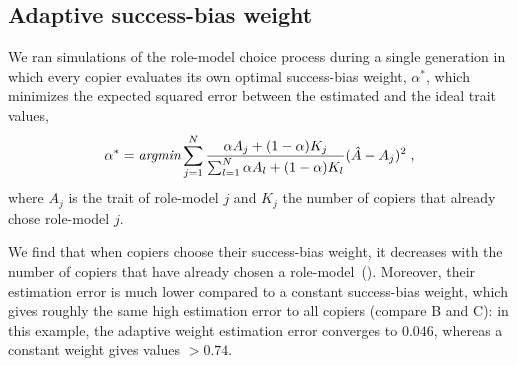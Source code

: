 \documentclass[12pt]{extarticle}
\begin{document}
\subsection*{Adaptive success-bias weight}

We ran simulations of the role-model choice process during a single generation in which every copier evaluates its own optimal success-bias weight, $\alpha^*$, which minimizes the expected squared error between the estimated and the ideal trait values,
\begin{equation}
\alpha^* = \emph{argmin} \sum_{j=1}^N\frac{\alpha A_j + (1-\alpha) K_j}{\sum_{l=1}^N\alpha A_l + (1-\alpha) K_l} (\hat{A}-A_j)^2 \;,
\end{equation}
where $A_j$ is the trait of role-model $j$ and $K_j$ the number of copiers that already chose role-model $j$.

We find that when copiers {choose} their success-bias weight, it decreases with the number of copiers that have already chosen a role-model~().
Moreover, their estimation error is much lower compared to a constant success-bias weight, which gives roughly the same high estimation error to all copiers (compare B and C): in this example, the adaptive weight estimation error converges to $0.046$, whereas a constant weight gives values $>0.74$.
\end{document}
